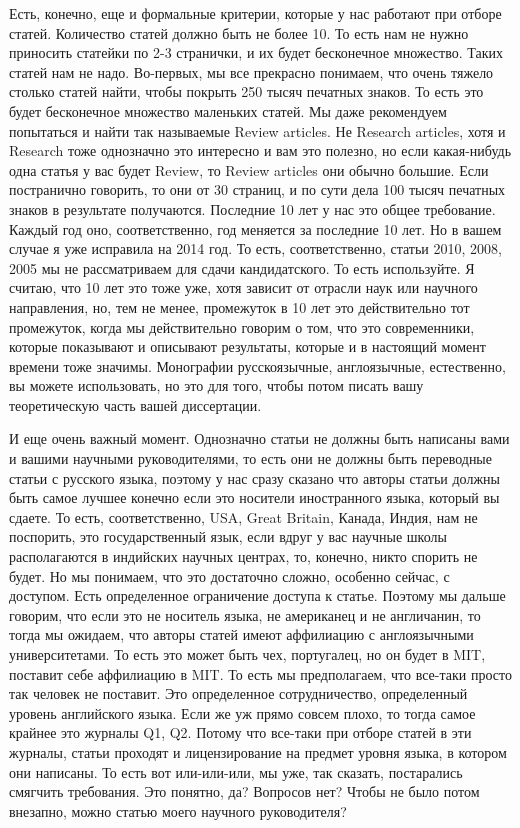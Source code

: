 \documentclass[main.tex]{subfiles}
\begin{document}
Есть, конечно, еще и формальные критерии, которые у нас работают при отборе статей.
Количество статей должно быть не более 10.
То есть нам не нужно приносить статейки по 2-3 странички, и их будет бесконечное множество.
Таких статей нам не надо.
Во-первых, мы все прекрасно понимаем, что очень тяжело столько статей найти, чтобы покрыть 250 тысяч печатных знаков.
То есть это будет бесконечное множество маленьких статей.
Мы даже рекомендуем попытаться и найти так называемые Review articles.
Не Research articles, хотя и Research тоже однозначно это интересно и вам это полезно, но если какая-нибудь одна статья у вас будет Review, то Review articles они обычно большие.
Если постранично говорить, то они от 30 страниц, и по сути дела 100 тысяч печатных знаков в результате получаются.
Последние 10 лет у нас это общее требование.
Каждый год оно, соответственно, год меняется за последние 10 лет.
Но в вашем случае я уже исправила на 2014 год.
То есть, соответственно, статьи 2010, 2008, 2005 мы не рассматриваем для сдачи кандидатского.
То есть используйте.
Я считаю, что 10 лет это тоже уже, хотя зависит от отрасли наук или научного направления, но, тем не менее, промежуток в 10 лет это действительно тот промежуток, когда мы действительно говорим о том, что это современники, которые показывают и описывают результаты, которые и в настоящий момент времени тоже значимы.
Монографии русскоязычные, англоязычные, естественно, вы можете использовать, но это для того, чтобы потом писать вашу теоретическую часть вашей диссертации.

И еще очень важный момент.
Однозначно статьи не должны быть написаны вами и вашими научными руководителями, то есть они не должны быть переводные статьи с русского языка, поэтому у нас сразу сказано что авторы статьи должны быть самое лучшее конечно если это носители иностранного языка, который вы сдаете.
То есть, соответственно, USA, Great Britain, Канада, Индия, нам не поспорить, это государственный язык, если вдруг у вас научные школы располагаются в индийских научных центрах, то, конечно, никто спорить не будет.
Но мы понимаем, что это достаточно сложно, особенно сейчас, с доступом.
Есть определенное ограничение доступа к статье.
Поэтому мы дальше говорим, что если это не носитель языка, не американец и не англичанин, то тогда мы ожидаем, что авторы статей имеют аффилиацию с англоязычными университетами.
То есть это может быть чех, португалец, но он будет в MIT, поставит себе аффилиацию в MIT.
То есть мы предполагаем, что все-таки просто так человек не поставит.
Это определенное сотрудничество, определенный уровень английского языка.
Если же уж прямо совсем плохо, то тогда самое крайнее это журналы Q1, Q2.
Потому что все-таки при отборе статей в эти журналы, статьи проходят и лицензирование на предмет уровня языка, в котором они написаны.
То есть вот или-или-или, мы уже, так сказать, постарались смягчить требования.
Это понятно, да?
Вопросов нет?
Чтобы не было потом внезапно, можно статью моего научного руководителя?
\end{document}
